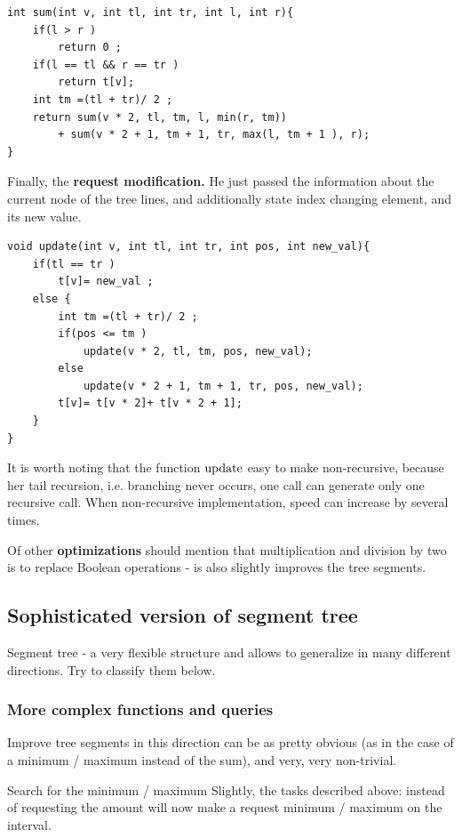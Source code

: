 \begin{verbatim}
int sum(int v, int tl, int tr, int l, int r){
    if(l > r )
        return 0 ;
    if(l == tl && r == tr )
        return t[v];
    int tm =(tl + tr)/ 2 ;
    return sum(v * 2, tl, tm, l, min(r, tm))
        + sum(v * 2 + 1, tm + 1, tr, max(l, tm + 1 ), r);
} 
\end{verbatim}
Finally, the \textbf{request modification.} He just passed the information about the current node of the tree lines, and additionally state index changing element, and its new value.

\begin{verbatim}
void update(int v, int tl, int tr, int pos, int new_val){
    if(tl == tr )
        t[v]= new_val ;
    else {
        int tm =(tl + tr)/ 2 ;
        if(pos <= tm )
            update(v * 2, tl, tm, pos, new_val);
        else
            update(v * 2 + 1, tm + 1, tr, pos, new_val);
        t[v]= t[v * 2]+ t[v * 2 + 1];
    }
} 
\end{verbatim}
It is worth noting that the function $\rm update$ easy to make non-recursive, because her tail recursion, i.e. branching never occurs, one call can generate only one recursive call. When non-recursive implementation, speed can increase by several times.

Of other \textbf{optimizations} should mention that multiplication and division by two is to replace Boolean operations - is also slightly improves the tree segments.

\subsection{ Sophisticated version of segment tree }

Segment tree - a very flexible structure and allows to generalize in many different directions. Try to classify them below.

\subsubsection{ More complex functions and queries }

Improve tree segments in this direction can be as pretty obvious (as in the case of a minimum / maximum instead of the sum), and very, very non-trivial.

Search for the minimum / maximum
Slightly, the tasks described above: instead of requesting the amount will now make a request minimum / maximum on the interval.

